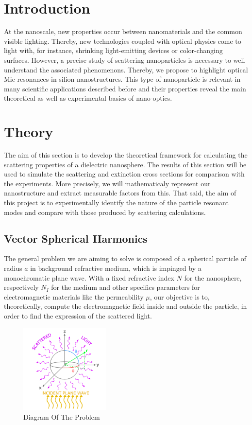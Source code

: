 \documentclass{article}
\numberwithin{equation}{section}
\begin{document}
\twocolumn

\section{Introduction}

At the nanoscale, new properties occur between nanomaterials and the common visible lighting. Thereby, new technologies coupled with optical physics come to light with, for instance, shrinking light-emitting devices or color-changing surfaces. However, a precise study of scattering nanoparticles is necessary to well understand the associated phenomenons. Thereby, we propose to highlight optical Mie resonances in silion nanostructures. This type of nanoparticle is relevant in many scientific applications described before and their properties reveal the main theoretical as well as experimental basics of nano-optics.

\section{Theory}

The aim of this section is to develop the theoretical framework for calculating the scattering properties of a dielectric nanosphere. The results of this section will be used to simulate the scattering and extinction cross sections for comparison with the experiments. More precisely, we will mathematicaly represent our nanostructure and extract measurable factors from this. That said, the aim of this project is to experimentally identify the nature of the particle resonant modes and compare with those produced by scattering calculations.

\subsection{Vector Spherical Harmonics}

The general problem we are aiming to solve is composed of a spherical particle of radius $a$ in background refractive medium, which is impinged by a monochromatic plane wave. With a fixed refractive index $N$ for the nanosphere, respectively $N_{I}$ for the medium and other specifics parameters for electromagnetic materials like the permeability $\mu$, our objective is to, theoretically, compute the electromagnetic field inside and outside the particle, in order to find the expression of the scattered light.
\begin{figure}[h!]
    \centering
    \includegraphics[width=0.4\textwidth, height=0.4\textwidth]{reference_frame.png}
    \caption{Diagram Of The Problem}
    \label{fig:system}
\end{figure}
\end{document}

